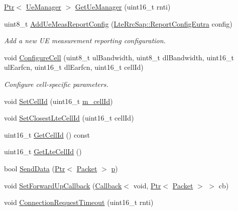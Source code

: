\begin{DoxyCompactItemize}
\item 
\hyperlink{classns3_1_1Ptr}{Ptr}$<$ \hyperlink{classns3_1_1UeManager}{Ue\+Manager} $>$ \hyperlink{classns3_1_1LteEnbRrc_a875653948b565dc50b33f6a0434e32d9}{Get\+Ue\+Manager} (uint16\+\_\+t rnti)
\item 
uint8\+\_\+t \hyperlink{classns3_1_1LteEnbRrc_a4b9348b6c39a805cd23d3ed4a5091ae5}{Add\+Ue\+Meas\+Report\+Config} (\hyperlink{structns3_1_1LteRrcSap_1_1ReportConfigEutra}{Lte\+Rrc\+Sap\+::\+Report\+Config\+Eutra} config)
\begin{DoxyCompactList}\small\item\em Add a new UE measurement reporting configuration. \end{DoxyCompactList}\item 
void \hyperlink{classns3_1_1LteEnbRrc_a28baabf29624b37f55d017665be407c0}{Configure\+Cell} (uint8\+\_\+t ul\+Bandwidth, uint8\+\_\+t dl\+Bandwidth, uint16\+\_\+t ul\+Earfcn, uint16\+\_\+t dl\+Earfcn, uint16\+\_\+t cell\+Id)
\begin{DoxyCompactList}\small\item\em Configure cell-\/specific parameters. \end{DoxyCompactList}\item 
void \hyperlink{classns3_1_1LteEnbRrc_af5582ac70d0e0c88b8fc0601bf3e9ced}{Set\+Cell\+Id} (uint16\+\_\+t \hyperlink{classns3_1_1LteEnbRrc_a4ced331e168e6c1aeca0bb11be19b8c7}{m\+\_\+cell\+Id})
\item 
void \hyperlink{classns3_1_1LteEnbRrc_a3c049c1ffa773abaf15decb3ee4d4485}{Set\+Closest\+Lte\+Cell\+Id} (uint16\+\_\+t cell\+Id)
\item 
uint16\+\_\+t \hyperlink{classns3_1_1LteEnbRrc_a6434124bae1aad9e69c2584e2cb98f8c}{Get\+Cell\+Id} () const 
\item 
uint16\+\_\+t \hyperlink{classns3_1_1LteEnbRrc_ac2238c88c3ce37b6d9c68c6b3fa35069}{Get\+Lte\+Cell\+Id} ()
\item 
bool \hyperlink{classns3_1_1LteEnbRrc_a374dcac41a9e115b97af5c69c998aabc}{Send\+Data} (\hyperlink{classns3_1_1Ptr}{Ptr}$<$ \hyperlink{classns3_1_1Packet}{Packet} $>$ \hyperlink{lte__link__budget__x2__handover__measures_8m_ac9de518908a968428863f829398a4e62}{p})
\item 
void \hyperlink{classns3_1_1LteEnbRrc_af06eb13a428ff4b088d8851a96890e0a}{Set\+Forward\+Up\+Callback} (\hyperlink{classns3_1_1Callback}{Callback}$<$ void, \hyperlink{classns3_1_1Ptr}{Ptr}$<$ \hyperlink{classns3_1_1Packet}{Packet} $>$ $>$ cb)
\item 
void \hyperlink{classns3_1_1LteEnbRrc_ad7992d8a886b60ee953879d9b5d37dca}{Connection\+Request\+Timeout} (uint16\+\_\+t rnti)

\end{DoxyCompactItemize}

